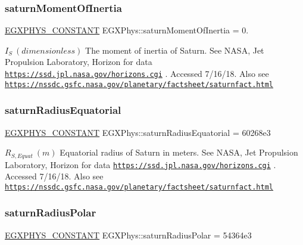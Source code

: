 \subsubsection{\texorpdfstring{saturn\+Moment\+Of\+Inertia}{saturnMomentOfInertia}}
{\footnotesize\ttfamily \mbox{\hyperlink{group___e_g_x_phys-_constants-_macros_ga76980d288494ce1714c9ac68a95ba702}{E\+G\+X\+P\+H\+Y\+S\+\_\+\+C\+O\+N\+S\+T\+A\+NT}} E\+G\+X\+Phys\+::saturn\+Moment\+Of\+Inertia = 0.}

$ I_{S} \ (dimensionless)$ The moment of inertia of Saturn. See N\+A\+SA, Jet Propulsion Laboratory, Horizon for data \href{https://ssd.jpl.nasa.gov/horizons.cgi}{\tt https\+://ssd.\+jpl.\+nasa.\+gov/horizons.\+cgi} . Accessed 7/16/18. Also see \href{https://nssdc.gsfc.nasa.gov/planetary/factsheet/saturnfact.html}{\tt https\+://nssdc.\+gsfc.\+nasa.\+gov/planetary/factsheet/saturnfact.\+html} \mbox{\label{group___e_g_x_phys-_constants-_astrophysics-_solar_system-_saturn-_bulk_gaaf3daee394b6d056e04390cf2c2a42a6}} 
\subsubsection{\texorpdfstring{saturn\+Radius\+Equatorial}{saturnRadiusEquatorial}}
{\footnotesize\ttfamily \mbox{\hyperlink{group___e_g_x_phys-_constants-_macros_ga76980d288494ce1714c9ac68a95ba702}{E\+G\+X\+P\+H\+Y\+S\+\_\+\+C\+O\+N\+S\+T\+A\+NT}} E\+G\+X\+Phys\+::saturn\+Radius\+Equatorial = 60268e3}

$R_{S,Equat} \ (m)$ Equatorial radius of Saturn in meters. See N\+A\+SA, Jet Propulsion Laboratory, Horizon for data \href{https://ssd.jpl.nasa.gov/horizons.cgi}{\tt https\+://ssd.\+jpl.\+nasa.\+gov/horizons.\+cgi} . Accessed 7/16/18. Also see \href{https://nssdc.gsfc.nasa.gov/planetary/factsheet/saturnfact.html}{\tt https\+://nssdc.\+gsfc.\+nasa.\+gov/planetary/factsheet/saturnfact.\+html} \mbox{\label{group___e_g_x_phys-_constants-_astrophysics-_solar_system-_saturn-_bulk_gad678086368931db863e6d48445f6459b}} 
\subsubsection{\texorpdfstring{saturn\+Radius\+Polar}{saturnRadiusPolar}}
{\footnotesize\ttfamily \mbox{\hyperlink{group___e_g_x_phys-_constants-_macros_ga76980d288494ce1714c9ac68a95ba702}{E\+G\+X\+P\+H\+Y\+S\+\_\+\+C\+O\+N\+S\+T\+A\+NT}} E\+G\+X\+Phys\+::saturn\+Radius\+Polar = 54364e3}

